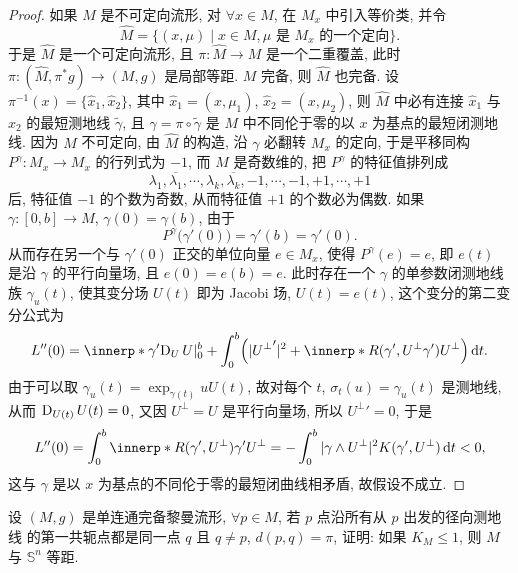 \begin{proof}
  如果 $M$ 是不可定向流形, 对 $\forall x\in M$, 在 $M_x$ 中引入等价类,
  并令 
  \[\widehat{M}=\{(x,\mu)\mid x\in M, \mu\text{\ 是\ }M_x\text{\ 的一个定向}\}.\]
  于是 $\widehat{M}$ 是一个可定向流形, 且 $\pi\colon\widehat{M}\to M$
  是一个二重覆盖, 此时 $\pi\colon (\widehat{M},\pi^*g)\to (M,g)$
  是局部等距. $M$ 完备, 则 $\widehat{M}$ 也完备. 
  设 $\pi^{-1}(x)=\{\hat{x}_1,\hat{x}_2\}$, 其中 $\hat{x}_1=(x,\mu_1)$, $\hat{x}_2=(x,\mu_2)$,
  则 $\widehat{M}$ 中必有连接 $\hat{x}_1$ 与 $\hat{x}_2$ 的最短测地线 $\tilde{\gamma}$,
  且 $\gamma = \pi\circ\tilde{\gamma}$ 是 $M$ 中不同伦于零的以 $x$ 为基点的最短闭测地线.
  因为 $M$ 不可定向, 由 $\widehat{M}$ 的构造, 沿 $\gamma$ 必翻转 $M_x$
  的定向, 于是平移同构 $P^{\gamma}\colon M_x\to M_x$ 的行列式为 $-1$,
  而 $M$ 是奇数维的, 把 $P^{\gamma}$ 的特征值排列成
  \[\lambda_1, \overline{\lambda_1}, \cdots, \lambda_k, \overline{\lambda_k},
    -1, \cdots, -1, +1, \cdots, +1\]
  后, 特征值 $-1$ 的个数为奇数, 从而特征值 $+1$ 的个数必为偶数.
  如果 $\gamma\colon [0,b]\to M$, $\gamma(0)=\gamma(b)$, 由于
  \[P^{\gamma}\bigl(\gamma'(0)\bigr) = \gamma'(b)=\gamma'(0).\]
  从而存在另一个与 $\gamma'(0)$ 正交的单位向量 $e\in M_x$,
  使得 $P^{\gamma}(e)=e$, 即 $e(t)$ 是沿 $\gamma$ 的平行向量场,
  且 $e(0)=e(b)=e$.
  此时存在一个 $\gamma$ 的单参数闭测地线族 $\gamma_u(t)$,
  使其变分场 $U(t)$ 即为 Jacobi 场, $U(t)=e(t)$,
  这个变分的第二变分公式为
  \[L''(0) = \innerp*{\gamma'}{\D_UU}|_0^b
    + \int_0^b \Bigl(|{U^{\perp}}'|^2 + \innerp*{R(\gamma', U^{\perp}\gamma')}{U^{\perp}}\Bigr)
    \diff t.\]
  由于可以取 $\gamma_u(t)=\exp_{\gamma(t)}uU(t)$,
  故对每个 $t$, $\sigma_t(u) = \gamma_u(t)$ 是测地线, 从而 $\operatorname{D}_{U(t)}U(t)=0$,
  又因 $U^{\perp}=U$ 是平行向量场, 所以 ${U^{\perp}}'=0$, 于是
  \[L''(0) = \int_0^b \innerp*{R(\gamma', U^{\perp})\gamma'}{U^{\perp}}
    = -\int_0^b |\gamma\wedge U^{\perp}|^2 K(\gamma', U^{\perp})\diff t <0,\]
  这与 $\gamma$ 是以 $x$ 为基点的不同伦于零的最短闭曲线相矛盾,
  故假设不成立.
\end{proof}



\begin{exercise}[7]
  设 $(M,g)$ 是单连通完备黎曼流形, $\forall p\in M$, 若 $p$ 点沿所有从 $p$ 出发的径向测地线
  的第一共轭点都是同一点 $q$ 且 $q\neq p$, $d(p,q)=\pi$,
  证明: 如果 $K_M\leq 1$, 则 $M$ 与 $\mathbb{S}^n$ 等距.
\end{exercise}

